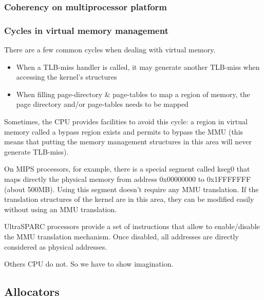 \begin{frame}
  \frametitle{Coherency on multiprocessor platform}

  \begin{center}
  \end{center}

\end{frame}

\begin{frame}
  \frametitle{Cycles in virtual memory management}

  There are a few common cycles when dealing with virtual memory.

  \begin{itemize}
  \item
    When a TLB-miss handler is called, it may generate another
    TLB-miss when accessing the kernel's structures
  \item
    When filling page-directory \& page-tables to map a region of
    memory, the page directory and/or page-tables needs to be mapped
  \end{itemize}

  \-

  Sometimes, the CPU provides facilities to avoid this cycle: a region
  in virtual memory called a bypass region exists and permits to
  bypass the MMU (this means that putting the memory management
  structures in this area will never generate TLB-miss).

  \-

  On MIPS processors, for example, there is a special segment called kseg0 that maps directly the physical memory from address 0x00000000 to 0x1FFFFFFF (about 500MB). Using this segment doesn't require any MMU translation. If the translation structures of the kernel are in this area, they can be modified easily without using an MMU translation.

  \-

  UltraSPARC processors provide a set of instructions that allow to enable/disable the MMU translation mechanism. Once disabled, all addresses are directly considered as physical addresses. 

  \-

  Others CPU do not. So we have to show imagination.

\end{frame}


\subsection{Allocators}

